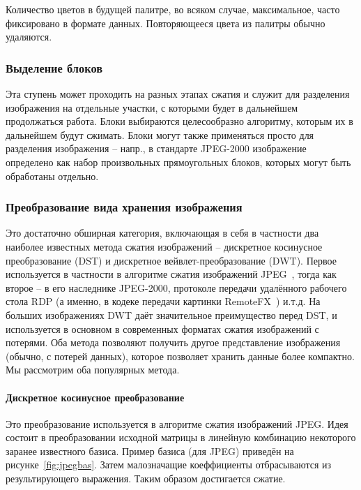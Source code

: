 \documentclass[a4paper,12pt]{article}
\numberwithin{equation}{section}
\begin{document}
Количество цветов в будущей палитре, во всяком случае, максимальное, часто
фиксировано в формате данных. Повторяющееся цвета из палитры обычно удаляются.

\subsubsection{Выделение блоков}

Эта ступень может проходить на разных этапах сжатия и служит для разделения
изображения на отдельные участки, с которыми будет в дальнейшем продолжаться
работа. Блоки выбираются целесообразно алгоритму, которым их в дальнейшем будут
сжимать. Блоки могут также применяться просто для разделения изображения --
напр., в стандарте JPEG-2000 изображение определено как набор произвольных
прямоугольных блоков, которых могут быть обработаны отдельно. 

\subsubsection{Преобразование вида хранения изображения}

Это достаточно обширная категория, включающая в себя в частности два наиболее
известных метода сжатия изображений -- дискретное косинусное преобразование
(DST) и дискретное вейвлет-преобразование (DWT). Первое используется в частности
в алгоритме сжатия изображений JPEG~\cite{jpeg}, тогда как второе -- в его
наследнике JPEG-2000, протоколе передачи удалённого рабочего стола RDP (а
именно, в кодеке передачи картинки RemoteFX~\cite{remotefx}) и.т.д. На больших
изображениях DWT даёт значительное преимущество перед DST, и используется в
основном в современных форматах сжатия изображений с потерями. Оба метода
позволяют получить другое представление изображения (обычно, с потерей данных),
которое позволяет хранить данные более компактно. Мы рассмотрим оба популярных
метода.

\paragraph{Дискретное косинусное преобразование}
Это преобразование используется в алгоритме сжатия изображений JPEG. Идея
состоит в преобразовании исходной матрицы в линейную комбинацию некоторого
заранее известного базиса. Пример базиса (для JPEG) приведён на
рисунке~\ref{fig:jpegbas}. Затем малозначащие коеффициенты отбрасываются из
результирующего выражения. Таким образом достигается сжатие.
\end{document}
